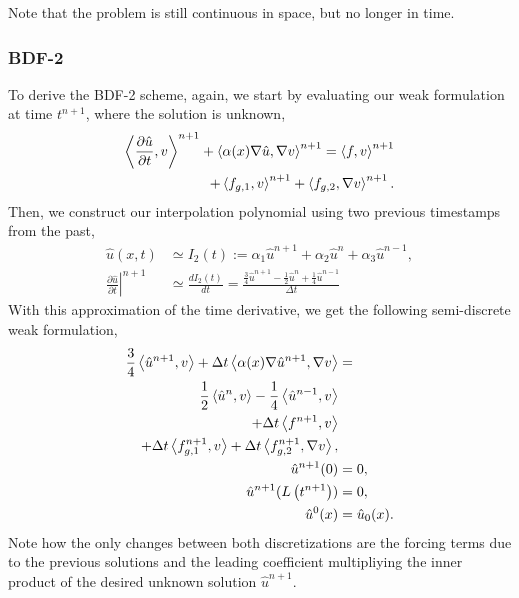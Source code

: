 \documentclass[../../main.tex]{subfiles}
\newcommand{\inner}[2]{\left<#1, #2\right>}
\begin{document}
Note that the problem is still continuous in space, but no longer in time.

\subsubsection{BDF-2}
To derive the BDF-2 scheme, again, we start by evaluating our weak formulation at time $t^{n+1}$, where the solution is unknown,
\begin{equation}
    \begin{split}
        \inner{\frac{\partial \hat{u}}{\partial t}}{v}^{n+1} + \inner{\alpha(x) \grad \hat{u}}{\grad v}^{n+1} = \inner{f}{v}^{n+1} \\
        + \inner{f_{g,1}}{v}^{n+1} + \inner{f_{g,2}}{\grad v}^{n+1}.
    \end{split}
\end{equation}
Then, we construct our interpolation polynomial using two previous timestamps from the past, 
\begin{align}
    \hat{u}(x,t) &\simeq I_2(t) := 
      \alpha_1 \hat{u}^{n+1} 
    + \alpha_2 \hat{u}^{n}
    + \alpha_3 \hat{u}^{n-1}, \\
    \left.\frac{\partial\hat{u}}{\partial t}\right|^{n+1} &\simeq \frac{d I_2(t)}{dt} = 
    \frac{\frac{3}{4}\hat{u}^{n+1} - \frac{1}{2}\hat{u}^{n} + \frac{1}{4}\hat{u}^{n-1}}{\Delta t}
\end{align}
With this approximation of the time derivative, we get the following semi-discrete weak formulation, 
\begin{subequations}
    \begin{align}
        \label{eq:1d_fom_weak_formulation_semidiscrete_time_bdf2}
        \frac{3}{4}\inner{\hat{u}^{n+1}}{v} + \Delta t \inner{\alpha(x) \grad \hat{u}^{n+1}}{\grad v} &= \\
          \frac{1}{2}\inner{\hat{u}^{n}}{v}
        - \frac{1}{4}\inner{\hat{u}^{n-1}}{v} \nonumber \\
        + \Delta t \inner{f^{n+1}}{v} \nonumber \\
        + \Delta t \inner{f_{g,1}^{n+1}}{v} + \Delta t \inner{f_{g,2}^{n+1}}{\grad v}, \nonumber \\
        \hat{u}^{n+1}(0) &= 0, \\
        \hat{u}^{n+1}(L\left(t^{n+1}\right)) &= 0, \\
        \hat{u}^{0}(x) &= \hat{u}_0(x).
    \end{align}
\end{subequations}
Note how the only changes between both discretizations are the forcing terms due to the previous solutions and the leading coefficient multipliying the inner product of the desired unknown solution $\hat{u}^{n+1}$. 
\end{document}
